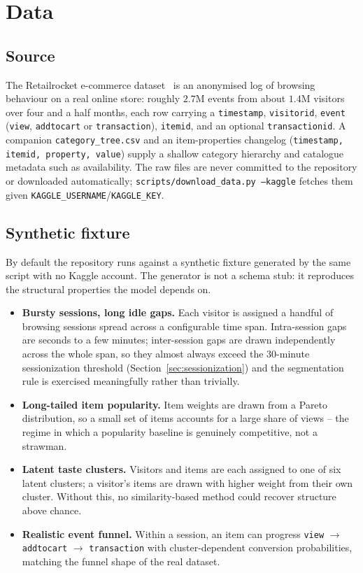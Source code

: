 \section{Data}
\label{sec:data}

\subsection{Source}

The Retailrocket e-commerce dataset~\cite{retailrocket2017dataset} is an
anonymised log of browsing behaviour on a real online store: roughly $2.7$M
events from about $1.4$M visitors over four and a half months, each row
carrying a \texttt{timestamp}, \texttt{visitorid}, \texttt{event}
(\texttt{view}, \texttt{addtocart} or \texttt{transaction}), \texttt{itemid},
and an optional \texttt{transactionid}. A companion \texttt{category\_tree.csv}
and an item-properties changelog (\texttt{timestamp, itemid, property, value})
supply a shallow category hierarchy and catalogue metadata such as
availability. The raw files are never committed to the repository or
downloaded automatically; \texttt{scripts/download\_data.py --kaggle} fetches
them given \texttt{KAGGLE\_USERNAME}/\texttt{KAGGLE\_KEY}.

\subsection{Synthetic fixture}

By default the repository runs against a synthetic fixture generated by the
same script with no Kaggle account. The generator is not a schema stub: it
reproduces the structural properties the model depends on.

\begin{itemize}
  \item \textbf{Bursty sessions, long idle gaps.} Each visitor is assigned a
        handful of browsing sessions spread across a configurable time span.
        Intra-session gaps are seconds to a few minutes; inter-session gaps
        are drawn independently across the whole span, so they almost always
        exceed the $30$-minute sessionization threshold
        (Section~\ref{sec:sessionization}) and the segmentation rule is
        exercised meaningfully rather than trivially.
  \item \textbf{Long-tailed item popularity.} Item weights are drawn from a
        Pareto distribution, so a small set of items accounts for a large
        share of views -- the regime in which a popularity baseline is
        genuinely competitive, not a strawman.
  \item \textbf{Latent taste clusters.} Visitors and items are each assigned
        to one of six latent clusters; a visitor's items are drawn with
        higher weight from their own cluster. Without this, no
        similarity-based method could recover structure above chance.
  \item \textbf{Realistic event funnel.} Within a session, an item can
        progress \texttt{view} $\to$ \texttt{addtocart} $\to$
        \texttt{transaction} with cluster-dependent conversion
        probabilities, matching the funnel shape of the real dataset.
\end{itemize}

